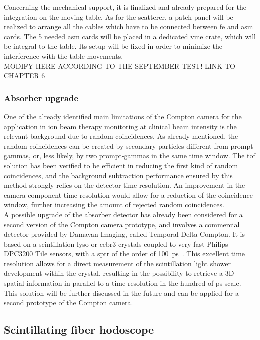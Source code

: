 Concerning the mechanical support, it is finalized and already prepared for the integration on the moving table. As for the scatterer, a patch panel will be realized to arrange all the cables which have to be connected between \gls{fe} and \gls{asm} cards. The 5 needed \gls{asm} cards will be placed in a dedicated \gls{vme} crate, which will be integral to the table. Its setup will be fixed in order to minimize the interference with the table movements.\\

MODIFY HERE ACCORDING TO THE SEPTEMBER TEST! LINK TO CHAPTER 6  

\subsubsection{Absorber upgrade}\label{chap3::subsubsec::absUpgrade} 

One of the already identified main limitations of the Compton camera for the application in ion beam therapy monitoring at clinical beam intensity is the relevant background due to random coincidences. As already mentioned, the random coincidences can be created by secondary particles different from prompt-gammas, or, less likely, by two prompt-gammas in the same time window. The \gls{tof} solution has been verified to be efficient in reducing the first kind of random coincidences, and the background subtraction performance ensured by this method strongly relies on the detector time resolution. An improvement in the camera component time resolution would allow for a reduction of the coincidence window, further increasing the amount of rejected random coincidences.\\ A possible upgrade of the absorber detector has already been considered for a second version of the Compton camera prototype, and involves a commercial detector provided by Damavan Imaging, called Temporal Delta Compton. It is based on a scintillation \gls{lyso} or \gls{cebr3} crystals coupled to very fast Philips DPC3200 Tile sensors, with a \gls{sptr} of the order of 100~ps~\parencite{Brunner2016}. This excellent time resolution allows for a direct measurement of the scintillation light shower development within the crystal, resulting in the possibility to retrieve a 3D spatial information in parallel to a time resolution in the hundred of ps scale. This solution will be further discussed in the future and can be applied for a second prototype of the Compton camera.  

\subsection{Scintillating fiber hodoscope}\label{chap3::subsec::hodoNext}


